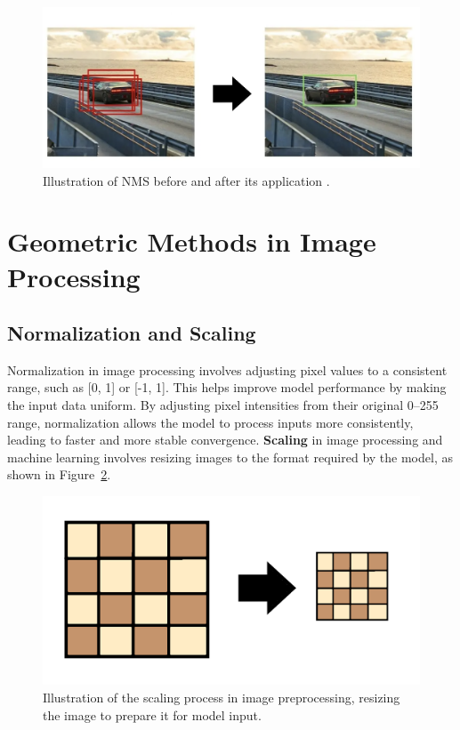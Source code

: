 \begin{figure}[h!]
    \centering
    \includegraphics[width=0.75\linewidth]{figures/theory/image-recognition/nms.png}
    \caption[NMS before and after]{Illustration of NMS before and after its application \cite{thepythoncode:nms}.}
    \label{fig:nms}
\end{figure}

\section{Geometric Methods in Image Processing}
\label{sec:geometric-methods}


\subsection*{Normalization and Scaling}
\label{subsec:normalization-and-scaling}

Normalization in image processing involves adjusting pixel values to a consistent range, such as [0, 1] or [-1, 1]. This helps improve model performance by making the input data uniform. By adjusting pixel intensities from their original 0–255 range, normalization allows the model to process inputs more consistently, leading to faster and more stable convergence.
\textbf{Scaling} in image processing and machine learning involves resizing images to the format required by the model, as shown in Figure~\ref{fig:nms}. 

\begin{figure}[h!]
    \centering
    \includegraphics[width=0.75\linewidth]{figures/theory/image-recognition/scaling.png}
    \caption[Scaling before and after]{Illustration of the scaling process in image preprocessing, resizing the image to prepare it for model input.}
    \label{fig:nms}
\end{figure}


